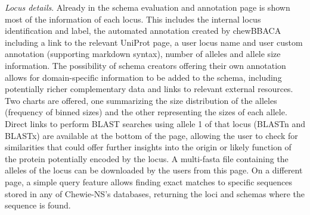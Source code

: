 \textit{Locus details}. Already in the schema evaluation and annotation page is shown most of the information of each locus. This includes the internal locus identification and label, the automated annotation created by chewBBACA including a link to the relevant UniProt \cite{uniprot_consortium_uniprot_2019} page, a user locus name and user custom annotation (supporting markdown syntax), number of alleles and allele size information. The possibility of schema creators offering their own annotation allows for domain-specific information to be added to the schema, including potentially richer complementary data and links to relevant external resources. Two charts are offered, one summarizing the size distribution of the alleles (frequency of binned sizes) and the other representing the sizes of each allele. Direct links to perform \ac{BLAST} searches using allele 1 of that locus (\ac{BLASTn} and \ac{BLASTx}) are available at the bottom of the page, allowing the user to check for similarities that could offer further insights into the origin or likely function of the protein potentially encoded by the locus. A multi-fasta file containing the alleles of the locus can be downloaded by the users from this page. On a different page, a simple query feature allows finding exact matches to specific sequences stored in any of \ac{Chewie-NS}’s databases, returning the loci and schemas where the sequence is found.

